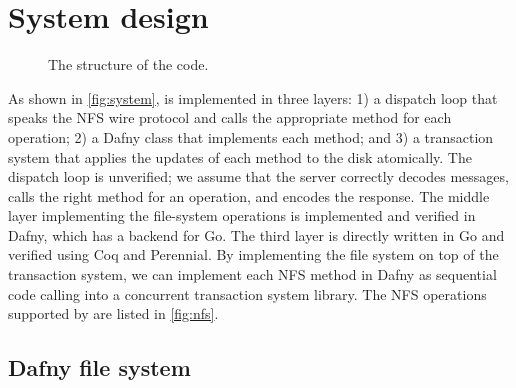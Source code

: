 \section{System design}%
\label{sec:system}


\begin{figure}
  \center
  
  \caption{The structure of the code.}
  \label{fig:system}
\end{figure}

As shown in \autoref{fig:system}, \sys is implemented in three layers:
1) a dispatch loop that speaks the NFS wire protocol and calls the
appropriate method for each operation; 2) a Dafny class that
implements each method; and 3) a transaction system that applies the
updates of each method to the disk atomically.  The dispatch loop is
unverified; we assume that the server correctly decodes messages,
calls the right method for an operation, and encodes the response. The
middle layer implementing the file-system operations is implemented
and verified in Dafny, which has a backend for Go.  The
third layer is directly written in Go and verified using Coq and
Perennial.  By implementing the file system on top of the transaction
system, we can implement each NFS method in Dafny as sequential code
calling into a concurrent transaction system library. The NFS
operations supported by \sys are listed in \autoref{fig:nfs}.

\subsection{Dafny file system}




